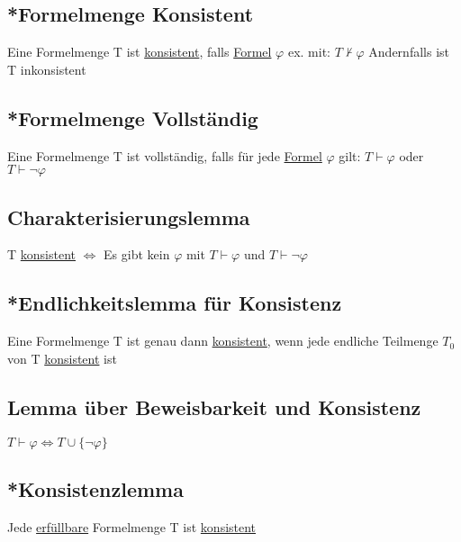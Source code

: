 \documentclass[12pt,a4paper]{article} %
\begin{document}
	\subsection{*Formelmenge Konsistent}
	Eine Formelmenge T ist \hyperref[ALKonsistent]{konsistent}, falls \hyperref[Formel]{Formel} $\varphi$ ex. mit: $T \nvdash \varphi$ Andernfalls ist T inkonsistent
	
	\subsection{*Formelmenge Vollständig}
	Eine Formelmenge T ist vollständig, falls für jede \hyperref[Formel]{Formel} $\varphi$ gilt: $T \hyperref[Beweisbar]{\vdash} \varphi$ oder $T \hyperref[Beweisbar]{\vdash} \neg \varphi$
	
	\subsection{Charakterisierungslemma}
	T \hyperref[ALKonsistent]{konsistent} $\Leftrightarrow$ Es gibt kein $\varphi$ mit $T \hyperref[Beweisbar]{\vdash} \varphi$ und $T \hyperref[Beweisbar]{\vdash} \neg \varphi$
	
	\subsection{*Endlichkeitslemma für Konsistenz}
	Eine Formelmenge T ist genau dann \hyperref[ALKonsistent]{konsistent}, wenn jede endliche Teilmenge $T_0$ von T \hyperref[ALKonsistent]{konsistent} ist
	
	\subsection{Lemma über Beweisbarkeit und Konsistenz}
	$T \hyperref[Beweisbar]{\vdash} \varphi \Leftrightarrow T \cup \{\neg \varphi\}$
	
	\subsection{*Konsistenzlemma}
	Jede \hyperref[Erfullbar]{erfüllbare} Formelmenge T ist \hyperref[ALKonsistent]{konsistent}
\end{document}
